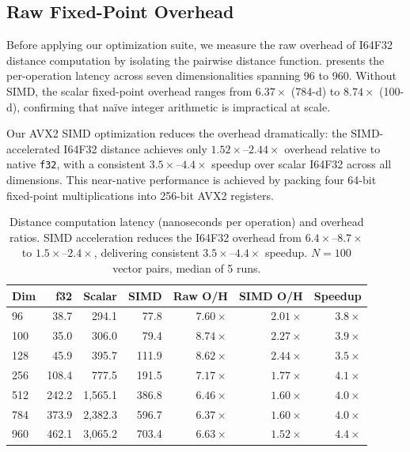 \documentclass[10pt,journal]{IEEEtran}
\begin{document}
\subsection{Raw Fixed-Point Overhead}

Before applying our optimization suite, we measure the raw overhead of I64F32 distance computation by isolating the pairwise distance function.  presents the per-operation latency across seven dimensionalities spanning 96 to 960. Without SIMD, the scalar fixed-point overhead ranges from $6.37\times$ (784-d) to $8.74\times$ (100-d), confirming that na\"ive integer arithmetic is impractical at scale.

Our AVX2 SIMD optimization reduces the overhead dramatically: the SIMD-accelerated I64F32 distance achieves only $1.52\times$--$2.44\times$ overhead relative to native \texttt{f32}, with a consistent $3.5\times$--$4.4\times$ speedup over scalar I64F32 across all dimensions. This near-native performance is achieved by packing four 64-bit fixed-point multiplications into 256-bit AVX2 registers.

\begin{table}[t]
  \centering
  \caption{Distance computation latency (nanoseconds per operation) and overhead ratios. SIMD acceleration reduces the I64F32 overhead from $6.4\times$--$8.7\times$ to $1.5\times$--$2.4\times$, delivering consistent $3.5\times$--$4.4\times$ speedup. $N{=}100$ vector pairs, median of 5 runs.}
  \label{tab:dist_overhead}
  \begin{tabular}{lrrrrrr}
    \toprule
    \textbf{Dim} & \textbf{f32} & \textbf{Scalar} & \textbf{SIMD} & \textbf{Raw O/H} & \textbf{SIMD O/H} & \textbf{Speedup} \\
    \midrule
    96   &  38.7 &   294.1 &  77.8 & $7.60\times$ & $2.01\times$ & $3.8\times$ \\
    100  &  35.0 &   306.0 &  79.4 & $8.74\times$ & $2.27\times$ & $3.9\times$ \\
    128  &  45.9 &   395.7 & 111.9 & $8.62\times$ & $2.44\times$ & $3.5\times$ \\
    256  & 108.4 &   777.5 & 191.5 & $7.17\times$ & $1.77\times$ & $4.1\times$ \\
    512  & 242.2 & 1{,}565.1 & 386.8 & $6.46\times$ & $1.60\times$ & $4.0\times$ \\
    784  & 373.9 & 2{,}382.3 & 596.7 & $6.37\times$ & $1.60\times$ & $4.0\times$ \\
    960  & 462.1 & 3{,}065.2 & 703.4 & $6.63\times$ & $1.52\times$ & $4.4\times$ \\
    \bottomrule
  \end{tabular}
\end{table}
\end{document}
